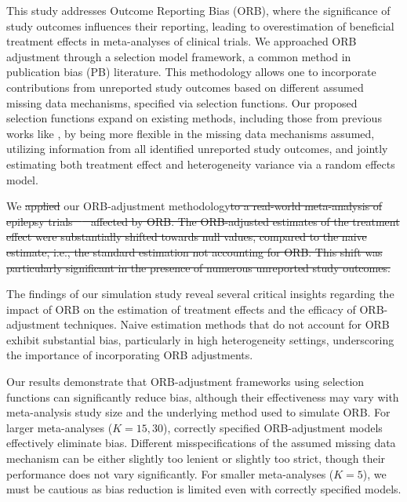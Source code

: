 \documentclass[twocolumn]{article}\usepackage[]{graphicx}\usepackage[]{xcolor}
\providecommand{\DIFaddtex}[1]{{\protect\color{blue}\uwave{#1}}} %
\providecommand{\DIFdeltex}[1]{{\protect\color{red}\sout{#1}}}                      %
\providecommand{\DIFaddbegin}{} %
\providecommand{\DIFaddend}{} %
\providecommand{\DIFdelbegin}{} %
\providecommand{\DIFdelend}{} %
\providecommand{\DIFadd}[1]{\texorpdfstring{\DIFaddtex{#1}}{#1}} %
\providecommand{\DIFdel}[1]{\texorpdfstring{\DIFdeltex{#1}}{}} %
\newcommand{\DIFscaledelfig}{0.5}
\newlength{\DIFdelgraphicswidth} %
\newlength{\DIFdelgraphicsheight} %
\newcommand{\DIFaddincludegraphics}[2][]{{\color{blue}\fbox{\DIFOincludegraphics[#1]{#2}}}} %
\newcommand{\DIFdelincludegraphics}[2][]{%
\sbox{\DIFdelgraphicsbox}{\DIFOincludegraphics[#1]{#2}}%
\settoboxwidth{\DIFdelgraphicswidth}{\DIFdelgraphicsbox} %
\settoboxtotalheight{\DIFdelgraphicsheight}{\DIFdelgraphicsbox} %
\scalebox{\DIFscaledelfig}{%
\parbox[b]{\DIFdelgraphicswidth}{\usebox{\DIFdelgraphicsbox}\\[-\baselineskip] \rule{\DIFdelgraphicswidth}{0em}}\llap{\resizebox{\DIFdelgraphicswidth}{\DIFdelgraphicsheight}{%
\setlength{\unitlength}{\DIFdelgraphicswidth}%
\begin{picture}(1,1)%
\thicklines\linethickness{2pt} %
{\color[rgb]{1,0,0}\put(0,0){\framebox(1,1){}}}%
{\color[rgb]{1,0,0}\put(0,0){\line( 1,1){1}}}%
{\color[rgb]{1,0,0}\put(0,1){\line(1,-1){1}}}%
\end{picture}%
}\hspace*{3pt}}} %
} %
\DeclareRobustCommand{\DIFaddbegin}{\DIFOaddbegin \let\includegraphics\DIFaddincludegraphics} %
\DeclareRobustCommand{\DIFaddend}{\DIFOaddend \let\includegraphics\DIFOincludegraphics} %
\DeclareRobustCommand{\DIFdelbegin}{\DIFOdelbegin \let\includegraphics\DIFdelincludegraphics} %
\DeclareRobustCommand{\DIFdelend}{\DIFOaddend \let\includegraphics\DIFOincludegraphics} %
\begin{document}
This study addresses Outcome Reporting Bias (ORB), where the significance of study outcomes influences their reporting, leading to overestimation of beneficial treatment effects in meta-analyses of clinical trials. We approached ORB adjustment through a selection model framework, a common method in publication bias (PB) literature. This methodology allows one to incorporate contributions from unreported study outcomes based on different assumed missing data mechanisms, specified via selection functions. Our proposed selection functions expand on existing methods, including those from previous works like \citet{Copas2019}, by being more flexible in the missing data mechanisms assumed, utilizing information from all identified unreported study outcomes, and jointly estimating both treatment effect and heterogeneity variance via a random effects model.

We \DIFdelbegin \DIFdel{applied }\DIFdelend \DIFaddbegin \DIFadd{conducted a simulation study on ORB and }\DIFaddend our ORB-adjustment methodology\DIFdelbegin \DIFdel{to a real-world meta-analysis of epilepsy trials \mbox{%
\citep{Copas2019, topiramate} }\hskip0pt%
affected by ORB. The ORB-adjusted estimates of the treatment effect were substantially shifted towards null values, compared to the naive estimate, i.e., the standard estimation not accounting for ORB. This shift was particularly significant in the presence of numerous unreported study outcomes.
}%

\DIFdelend \DIFaddbegin \DIFadd{. }\DIFaddend The findings of our simulation study reveal several critical insights regarding the impact of ORB on the estimation of treatment effects and the efficacy of ORB-adjustment techniques. Naive estimation methods that do not account for ORB exhibit substantial bias, particularly in high heterogeneity settings, underscoring the importance of incorporating ORB adjustments. 

Our results demonstrate that ORB-adjustment frameworks using selection functions can significantly reduce bias, although their effectiveness may vary with meta-analysis study size and the underlying method used to simulate ORB. For larger meta-analyses ($K= 15, 30$), correctly specified ORB-adjustment models effectively eliminate bias. Different misspecifications of the assumed missing data mechanism can be either slightly too lenient or slightly too strict, though their performance does not vary significantly. For smaller meta-analyses ($K=5$), we must be cautious as bias reduction is limited even with correctly specified models. 
\end{document}

